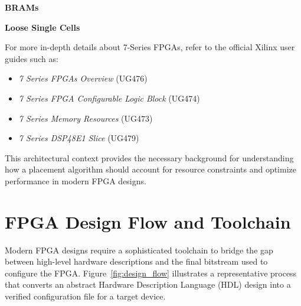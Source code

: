 \documentclass{article}
\begin{document}
        \begin{multicols}{2}


    \newpage

    \textbf{BRAMs} \quad 

    \textbf{Loose Single Cells} \quad


    For more in-depth details about 7-Series FPGAs, refer to the official Xilinx user guides such as:
    \begin{itemize}
        \item \emph{7 Series FPGAs Overview} (UG476)
        \item \emph{7 Series FPGA Configurable Logic Block} (UG474)
        \item \emph{7 Series Memory Resources} (UG473)
        \item \emph{7 Series DSP48E1 Slice} (UG479)
    \end{itemize}

    This architectural context provides the necessary background for understanding how a placement algorithm should account for resource constraints and optimize performance in modern FPGA designs.


\newpage
\section{FPGA Design Flow and Toolchain}
    \label{sec:fpga_flow_toolchain}

    Modern FPGA designs require a sophisticated toolchain to bridge the gap between high-level hardware descriptions and the final bitstream used to configure the FPGA. 
    Figure~\ref{fig:design_flow} illustrates a representative process that converts an abstract Hardware Description Language (HDL) design into a verified configuration file for a target device.


\end{multicols}
\end{document}
